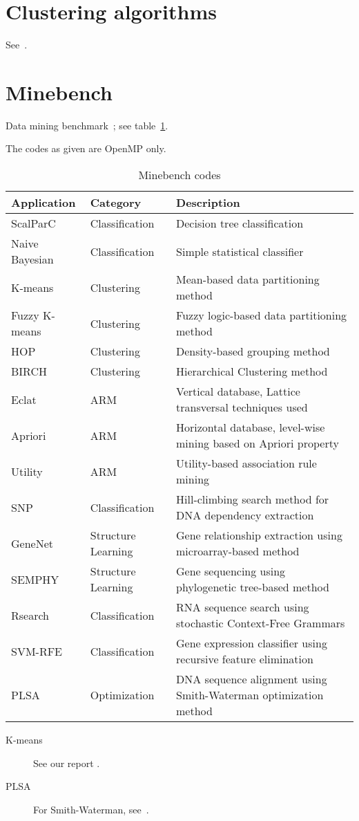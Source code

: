\documentclass[11pt,fleqn,preprint]{impreport}
\begin{document}
\section{Clustering algorithms}

See~\cite{IMP-12}.

\section{Minebench}


Data mining benchmark~\cite{MineBench-homepage,MineBench2006}; see table~\ref{tab:minebench}.

The codes as given are OpenMP only.

\begin{table}[ht]
  \begin{tabular}{|l|l|l|}
    \hline
    Application&Category&Description\\
    \hline
    ScalParC&  Classification&
        Decision tree classification\\
    Naive Bayesian&  Classification&
        Simple statistical classifier\\
    K-means&  Clustering&
        Mean-based data partitioning method\\
    Fuzzy K-means&  Clustering&
        Fuzzy logic-based data partitioning method\\
    HOP&  Clustering&
        Density-based grouping method\\
    BIRCH&  Clustering&
        Hierarchical Clustering method\\
    Eclat&  ARM&
        Vertical database, Lattice transversal techniques used\\
    Apriori&  ARM&
        Horizontal database, level-wise mining based on Apriori property\\
    Utility&  ARM&
        Utility-based association rule mining\\
    SNP&  Classification&
        Hill-climbing search method for DNA dependency extraction\\
    GeneNet&  Structure Learning&
        Gene relationship extraction using microarray-based method\\
    SEMPHY&  Structure Learning&
        Gene sequencing using phylogenetic tree-based method\\
    Rsearch&  Classification&
        RNA sequence search using stochastic Context-Free Grammars\\
    SVM-RFE&  Classification&
        Gene expression classifier using recursive feature elimination\\
    PLSA&  Optimization&
        DNA sequence alignment using Smith-Waterman optimization method\\
    \hline
  \end{tabular}
  \caption{Minebench codes}
  \label{tab:minebench}
\end{table}

\begin{description}
\item[K-means] See our report \cite{IMP-12}.
\item[PLSA] For Smith-Waterman, see~.
\end{description}


\end{document}
